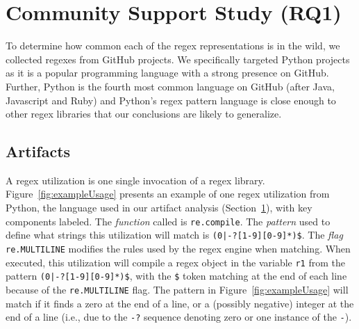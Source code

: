 %
%
%
%
%
%
%



\section{Community Support Study (RQ1)}
\label{communitystudy}
To determine how common each of the regex representations is in the wild, we collected
regexes from GitHub projects. We specifically targeted Python projects as it is a popular programming language with a strong presence on GitHub. Further, Python is the fourth most common language on GitHub (after Java, Javascript and Ruby) and Python's regex pattern
language is close enough to other regex libraries that our conclusions are likely to generalize.



\subsection{Artifacts}
A regex {utilization} is one single invocation of a regex library.
Figure~\ref{fig:exampleUsage} presents an example of one regex {utilization} from Python, the language used in our artifact analysis (Section~\ref{communitystudy}), with key components labeled. The \emph{function} called is {\tt re.compile}.  The \emph{pattern} used to define what strings this utilization will match is \verb!(0|-?[1-9][0-9]*)$!.  The \emph{flag} {\tt re.MULTILINE} modifies the rules used by the regex engine when matching. When executed, this {utilization}  will compile a regex object in the variable {\tt r1} from the pattern \verb!(0|-?[1-9][0-9]*)$!, with the \verb!$! token matching at the end of each line because of the {\tt re.MULTILINE} flag. 
  The pattern in Figure~\ref{fig:exampleUsage}  will match if it finds a zero at the end of a line, or a (possibly negative) integer at the end of a line (i.e., due to the {\tt -?} sequence denoting zero or one instance of the {\tt -}).

